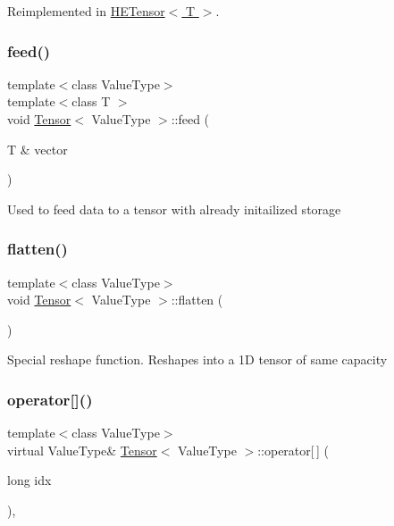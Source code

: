 Reimplemented in \hyperlink{classHETensor_ab0b9ca7b3826bc6c385514523e29de06}{H\+E\+Tensor$<$ T $>$}.

\mbox{\label{classTensor_a0cb0540d4f6ea27229eb623574780d94}} 
\subsubsection{\texorpdfstring{feed()}{feed()}}
{\footnotesize\ttfamily template$<$class Value\+Type$>$ \\
template$<$class T $>$ \\
void \hyperlink{classTensor}{Tensor}$<$ Value\+Type $>$\+::feed (\begin{DoxyParamCaption}\item[{T \&}]{vector }\end{DoxyParamCaption})\hspace{0.3cm}{\ttfamily [inline]}}

Used to feed data to a tensor with already initailized storage \mbox{\label{classTensor_a317bac130e357848259647c0add63e84}} 
\subsubsection{\texorpdfstring{flatten()}{flatten()}}
{\footnotesize\ttfamily template$<$class Value\+Type$>$ \\
void \hyperlink{classTensor}{Tensor}$<$ Value\+Type $>$\+::flatten (\begin{DoxyParamCaption}{ }\end{DoxyParamCaption})\hspace{0.3cm}{\ttfamily [inline]}}

Special reshape function. Reshapes into a 1D tensor of same capacity \mbox{\label{classTensor_a02fa9d476a6d1f85046380ef4eebbe34}} 
\subsubsection{\texorpdfstring{operator[]()}{operator[]()}}
{\footnotesize\ttfamily template$<$class Value\+Type$>$ \\
virtual Value\+Type\& \hyperlink{classTensor}{Tensor}$<$ Value\+Type $>$\+::operator\mbox{[}$\,$\mbox{]} (\begin{DoxyParamCaption}\item[{long}]{idx }\end{DoxyParamCaption})\hspace{0.3cm}{\ttfamily [inline]}, {\ttfamily [virtual]}}



